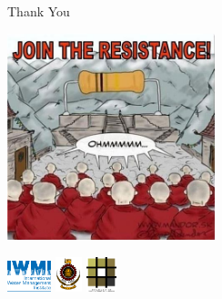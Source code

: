 \documentclass[xcolor=dvipsnames,beamer]{beamer} %
\begin{document}
\begin{frame}[fragile]{Thank You}

\begin{center}
 \includegraphics[height=6cm]{ohm}
\end{center}

\begin{flushright}
 \includegraphics[height=0.9cm]{iwmi}
 \hspace{5mm}
 \includegraphics[height=1cm]{uoMoratuwa}
 \hspace{5mm}
 \includegraphics[height=1cm]{uoMoratuwa_foa}
\end{flushright}

\end{frame}
\end{document}
